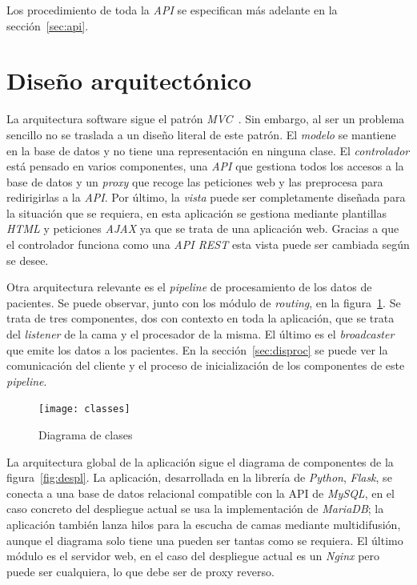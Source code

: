 Los procedimiento de toda la \textit{API} se especifican más adelante en la sección~\ref{sec:api}.

\section{Diseño arquitectónico}

La arquitectura software sigue el patrón \textit{MVC}~\cite{wiki:mvc}. Sin embargo, al ser un problema sencillo no se traslada a un diseño literal de este patrón. El \textit{modelo} se mantiene en la base de datos y no tiene una representación en ninguna clase. El \textit{controlador} está pensado en varios componentes, una \textit{API} que gestiona todos los accesos a la base de datos y un \textit{proxy} que recoge las peticiones web y las preprocesa para redirigirlas a la \textit{API}. Por último, la \textit{vista} puede ser completamente diseñada para la situación que se requiera, en esta aplicación se gestiona mediante plantillas \textit{HTML} y peticiones \textit{AJAX} ya que se trata de una aplicación web. Gracias a que el controlador funciona como una \textit{API REST} esta vista puede ser cambiada según se desee.

Otra arquitectura relevante es el \textit{pipeline} de procesamiento de los datos de pacientes. Se puede observar, junto con los módulo de \textit{routing}, en la figura~\ref{fig:classes}. Se trata de tres componentes, dos con contexto en toda la aplicación, que se trata del \textit{listener} de la cama y el procesador de la misma. El último es el \textit{broadcaster} que emite los datos a los pacientes. En la sección~\ref{sec:disproc} se puede ver la comunicación del cliente y el proceso de inicialización de los componentes de este \textit{pipeline}.

\begin{figure}
	\centering
	\texttt{[image: classes]}
	\caption{Diagrama de clases}
	\label{fig:classes}
\end{figure}

La arquitectura global de la aplicación sigue el diagrama de componentes de la figura~\ref{fig:despl}. La aplicación, desarrollada en la librería de \textit{Python}, \textit{Flask}, se conecta a una base de datos relacional compatible con la API de \textit{MySQL}, en el caso concreto del despliegue actual se usa la implementación de \textit{MariaDB}; la aplicación también lanza hilos para la escucha de camas mediante multidifusión, aunque el diagrama solo tiene una pueden ser tantas como se requiera. El último módulo es el servidor web, en el caso del despliegue actual es un \textit{Nginx} pero puede ser cualquiera, lo que debe ser de proxy reverso.

